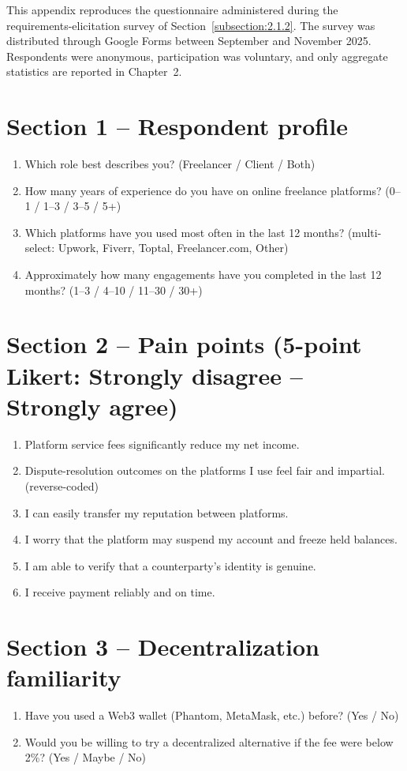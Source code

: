 This appendix reproduces the questionnaire administered during the requirements-elicitation survey of Section~\ref{subsection:2.1.2}. The survey was distributed through Google Forms between September and November 2025. Respondents were anonymous, participation was voluntary, and only aggregate statistics are reported in Chapter~2.

\section*{Section 1 -- Respondent profile}
\begin{enumerate}[noitemsep,label=Q\arabic*.]
    \item Which role best describes you? (Freelancer / Client / Both)
    \item How many years of experience do you have on online freelance platforms? (0--1 / 1--3 / 3--5 / 5+)
    \item Which platforms have you used most often in the last 12 months? (multi-select: Upwork, Fiverr, Toptal, Freelancer.com, Other)
    \item Approximately how many engagements have you completed in the last 12 months? (1--3 / 4--10 / 11--30 / 30+)
\end{enumerate}

\section*{Section 2 -- Pain points (5-point Likert: Strongly disagree -- Strongly agree)}
\begin{enumerate}[noitemsep,label=Q\arabic*., start=5]
    \item Platform service fees significantly reduce my net income.
    \item Dispute-resolution outcomes on the platforms I use feel fair and impartial. (reverse-coded)
    \item I can easily transfer my reputation between platforms.
    \item I worry that the platform may suspend my account and freeze held balances.
    \item I am able to verify that a counterparty's identity is genuine.
    \item I receive payment reliably and on time.
\end{enumerate}

\section*{Section 3 -- Decentralization familiarity}
\begin{enumerate}[noitemsep,label=Q\arabic*., start=11]
    \item Have you used a Web3 wallet (Phantom, MetaMask, etc.) before? (Yes / No)
    \item Would you be willing to try a decentralized alternative if the fee were below 2\%? (Yes / Maybe / No)
\end{enumerate}

